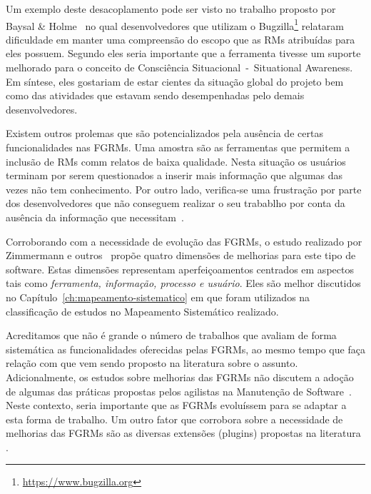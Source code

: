 
Um exemplo deste desacoplamento pode ser visto no trabalho proposto por Baysal
\& Holme~\cite{baysal2012qualitative} no qual desenvolvedores que utilizam o
Bugzilla\footnote{\url{https://www.bugzilla.org}} relataram dificuldade em
manter uma compreensão do escopo que as RMs atribuídas para eles possuem.
Segundo eles seria importante que a ferramenta tivesse um suporte melhorado para
o conceito de Consciência Situacional~-~Situational Awareness. Em síntese, eles
gostariam de estar cientes da situação global do projeto bem como das atividades
que estavam sendo desempenhadas pelo demais desenvolvedores.

Existem outros prolemas que são potencializados pela ausência de certas
funcionalidades nas FGRMs. Uma amostra são as ferramentas que permitem a
inclusão de RMs comm relatos de baixa qualidade. Nesta situação os usuários
terminam por serem questionados a inserir mais informação que algumas das vezes
não tem conhecimento. Por outro lado, verifica-se uma frustração por parte dos
desenvolvedores que não conseguem realizar o seu trabablho por conta da ausência
da informação que necessitam~\cite{just2008towards}.

Corroborando com a necessidade de evolução das FGRMs, o estudo realizado por
Zimmermann e outros~\cite{zimmermann2009improving} propõe quatro dimensões de
melhorias para este tipo de software. Estas dimensões representam
aperfeiçoamentos centrados em aspectos tais como \textit{ferramenta, informação,
    processo e usuário}. Eles são melhor discutidos no
Capítulo~\ref{ch:mapeamento-sistematico} em que foram utilizados na
classificação de estudos no Mapeamento Sistemático realizado.


Acreditamos que não é grande o número de trabalhos que avaliam de forma
sistemática as funcionalidades oferecidas pelas FGRMs, ao mesmo tempo que faça
relação com que vem sendo proposto na li\-te\-ra\-tu\-ra sobre o assunto.
Adicionalmente, os estudos sobre melhorias das FGRMs não discutem a adoção de
algumas das práticas propostas pelos agilistas na Manutenção de
Software~\cite{Soltan2016,Devulapally2015, Heeager2015}. Neste contexto, seria
importante que as FGRMs evoluíssem para se adaptar a esta forma de trabalho. Um
outro fator que corrobora sobre a necessidade de melhorias das FGRMs são as
diversas extensões (plugins) propostas na literatura
\cite{101186,Thung:2014:BIT:2635868.2661678,Kononenko:2014:DED:2591062.2591075}.

